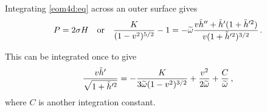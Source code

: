 Integrating \eqref{eom4d:eq} across an outer surface gives
%
\begin{equation}\label{bcnd4d:eq}
  P = 2\sigma H \quad \text{or} \quad
  \frac{K}{(1-v^2)^{5/2}}-1  =
    -\widetilde{\omega} \frac{v\tilde h''+ \tilde h'(1+\tilde h'^2)}{v(1+\tilde h'^2)^{3/2}}\,.
\end{equation}
%

This can be integrated once to give
\begin{equation}\label{bcyx4d:eq}
  \frac{v\tilde h'}{\sqrt{1+\tilde h'^2}} =
    -\frac{K}{3\widetilde{\omega}(1-v^2)^{3/2}} + \frac{v^2}{2\widetilde{\omega}}
     + \frac{C}{\widetilde{\omega}}\,,
\end{equation}
%
where $C$ is another integration constant.

